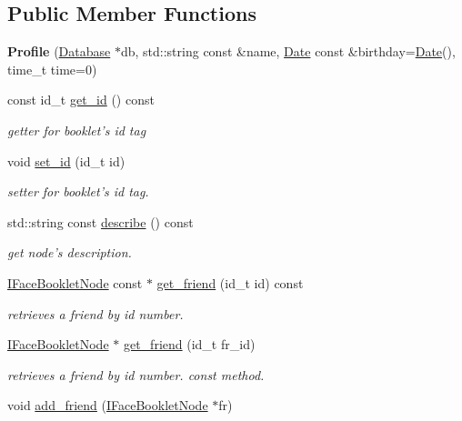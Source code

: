 \subsection*{Public Member Functions}
\begin{DoxyCompactItemize}
\item 
\hypertarget{classfb_1_1_profile_a42a0625bef011a0280735db1340e7235}{{\bfseries Profile} (\hyperlink{classfb_1_1_database}{Database} $\ast$db, std\+::string const \&name, \hyperlink{structfb_1_1_date}{Date} const \&birthday=\hyperlink{structfb_1_1_date}{Date}(), time\+\_\+t time=0)}\label{classfb_1_1_profile_a42a0625bef011a0280735db1340e7235}

\item 
const id\+\_\+t \hyperlink{classfb_1_1_profile_aee2df153f7923d0d5c24eb3c11dfff67}{get\+\_\+id} () const 
\begin{DoxyCompactList}\small\item\em getter for booklet's id tag \end{DoxyCompactList}\item 
void \hyperlink{classfb_1_1_profile_a8fe32885a03ac7c92675ede58a230f34}{set\+\_\+id} (id\+\_\+t id)
\begin{DoxyCompactList}\small\item\em setter for booklet's id tag. \end{DoxyCompactList}\item 
std\+::string const \hyperlink{classfb_1_1_profile_a657f6cab3f2caee6fc4b9c8758a711b3}{describe} () const 
\begin{DoxyCompactList}\small\item\em get node's description. \end{DoxyCompactList}\item 
\hyperlink{structfb_1_1_i_face_booklet_node}{I\+Face\+Booklet\+Node} const $\ast$ \hyperlink{classfb_1_1_profile_abd95cad4820c261601b20372f634bd2a}{get\+\_\+friend} (id\+\_\+t id) const 
\begin{DoxyCompactList}\small\item\em retrieves a friend by id number. \end{DoxyCompactList}\item 
\hyperlink{structfb_1_1_i_face_booklet_node}{I\+Face\+Booklet\+Node} $\ast$ \hyperlink{classfb_1_1_profile_a6c9f78b9cb0c1e30d22d17265736a956}{get\+\_\+friend} (id\+\_\+t fr\+\_\+id)
\begin{DoxyCompactList}\small\item\em retrieves a friend by id number. const method. \end{DoxyCompactList}\item 
\hypertarget{classfb_1_1_profile_a2090dc97786cb7cbabf2edf5065b0ddc}{void \hyperlink{classfb_1_1_profile_a2090dc97786cb7cbabf2edf5065b0ddc}{add\+\_\+friend} (\hyperlink{structfb_1_1_i_face_booklet_node}{I\+Face\+Booklet\+Node} $\ast$fr)}\label{classfb_1_1_profile_a2090dc97786cb7cbabf2edf5065b0ddc}


\end{DoxyCompactItemize}
